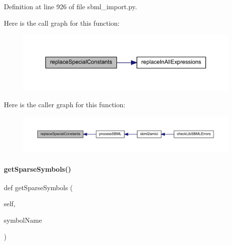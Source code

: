 Definition at line 926 of file sbml\+\_\+import.\+py.

Here is the call graph for this function\+:
\nopagebreak
\begin{figure}[H]
\begin{center}
\leavevmode
\includegraphics[width=350pt]{classamici_1_1sbml__import_1_1_sbml_importer_a5348e7b5041334f8c54b45c5c928dea0_cgraph}
\end{center}
\end{figure}
Here is the caller graph for this function\+:
\nopagebreak
\begin{figure}[H]
\begin{center}
\leavevmode
\includegraphics[width=350pt]{classamici_1_1sbml__import_1_1_sbml_importer_a5348e7b5041334f8c54b45c5c928dea0_icgraph}
\end{center}
\end{figure}
\mbox{\label{classamici_1_1sbml__import_1_1_sbml_importer_ab2f94e5b08034c5e07a26886369b71fd}} 
\paragraph{\texorpdfstring{get\+Sparse\+Symbols()}{getSparseSymbols()}}
{\footnotesize\ttfamily def get\+Sparse\+Symbols (\begin{DoxyParamCaption}\item[{}]{self,  }\item[{}]{symbol\+Name }\end{DoxyParamCaption})}


